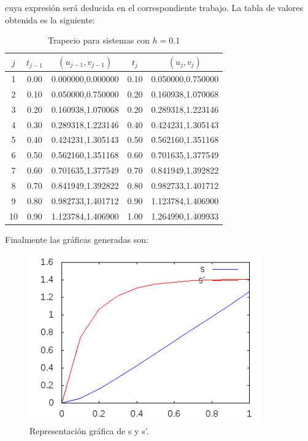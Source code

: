 \documentclass{article}
\theoremstyle{theorem-style}  %
\theoremstyle{definition-style}
\theoremstyle{example-style}
\begin{document}
cuya expresión será deducida en el correspondiente trabajo. La tabla de valores obtenida es la siguiente:

 \begin{table}[H]
		\centering
		\begin{tabular}{|| c | c | c | c | c ||}
			\hline
			\hline $j$ &  $t_{j-1}$ & $(u_{j-1},v_{j-1})$ & $t_j$ & $(u_{j},v_{j})$ \\
			\hline 1 & 0.00 & 0.000000,0.000000 & 0.10 & 0.050000,0.750000 \\
			\hline 2 & 0.10 & 0.050000,0.750000 & 0.20 & 0.160938,1.070068 \\
			\hline 3 & 0.20 & 0.160938,1.070068 & 0.20 & 0.289318,1.223146 \\
			\hline 4 & 0.30 & 0.289318,1.223146 & 0.40 & 0.424231,1.305143 \\
			\hline 5 & 0.40 & 0.424231,1.305143 & 0.50 & 0.562160,1.351168 \\
			\hline 6 & 0.50 & 0.562160,1.351168 & 0.60 & 0.701635,1.377549 \\
			\hline 7 & 0.60 & 0.701635,1.377549 & 0.70 & 0.841949,1.392822 \\
			\hline 8 & 0.70 & 0.841949,1.392822 & 0.80 & 0.982733,1.401712 \\
			\hline 9 & 0.80 & 0.982733,1.401712 & 0.90 & 1.123784,1.406900 \\
			\hline 10 & 0.90 & 1.123784,1.406900 & 1.00 & 1.264990,1.409933 \\
		\end{tabular}
		\caption{Trapecio para sistemas con $h=0.1$}
		\label{table:trapecio-ej3}
	\end{table}

	Finalmente las gráficas generadas son:

	\begin{figure}[h]
		\centering
		\includegraphics[width=10cm]{./Images/ejemplo3-1.png}
		\caption{Representación gráfica de s y s'.}
		\label{fig:ejemplo3-1}
	\end{figure}
\end{document}
